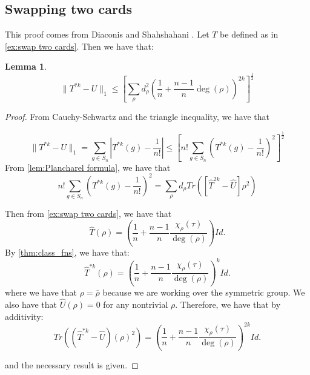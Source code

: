 \documentclass[]{article}
\newtheorem{lemma}[theorem]{Lemma}
\theoremstyle{definition}
\numberwithin{theorem}{section}
\numberwithin{equation}{section}
\begin{document}
\subsection{Swapping two cards}
This proof comes from Diaconis and Shahshahani \cite{diaconisGeneratingRandomPermutation1981}. 
Let $T$ be defined as in \cref{ex:swap two cards}. Then we have that:
	\begin{lemma}
	\begin{equation}
		\| T^{\ast k} - U \|_1 \leq \left[\sum_\rho d^2_\rho \left(\frac{1}{n} + \frac{n-1}{n} \deg(\rho)\right)^{2k}\right]^{\frac{1}{2}}
	\end{equation}
\end{lemma}

\begin{proof}
	From Cauchy-Schwartz and the triangle inequality, we have that

\begin{equation}
	\| T^{\ast k} - U \|_1 = \sum_{g \in S_n} \left|T^{\ast k}(g) - \frac{1}{n!}\right| \leq \left[n! \sum_{g \in S_n} \left(T^{*k}(g) - \frac{1}{n!}\right)^2\right]^{\frac{1}{2}}
\end{equation}
From \cref{lem:Plancharel formula}, we have that
\begin{equation}
	n! \sum_{g \in S_n} \left(T^{*k}(g) - \frac{1}{n!}\right)^2 = \sum_\rho d_\rho Tr\left([\widehat{T}^{2k} - \widehat{U}] \rho^2\right)
\end{equation}

Then from \cref{ex:swap two cards}, we have that
\begin{equation}
	\widehat{T}(\rho)= \left(\frac{1}{n} + \frac{n-1}{n} \frac{\chi_\rho(\tau)}{\deg(\rho)}\right) Id.
\end{equation}
By \cref{thm:class_fns}, we have that:
\begin{equation}
	\widehat{T}^{\ast k}(\rho)= \left(\frac{1}{n} + \frac{n-1}{n} \frac{\chi_\rho(\tau)}{\deg(\rho)}\right)^k Id.
\end{equation}
where we have that $\rho = \overline{\rho}$ because we are working over the symmetric group.
We also have that $\widehat{U}(\rho) = 0$ for any nontrivial $\rho$. Therefore, we have that by additivity: 
\begin{equation}
	Tr((\widehat{T}^{\ast k}  - \widehat{U})(\rho)^2 ) = \left(\frac{1}{n} + \frac{n-1}{n} \frac{\chi_\rho(\tau)}{\deg(\rho)}\right)^{2k} Id.
\end{equation}

and the necessary result is given. 
\end{proof}
\end{document}
